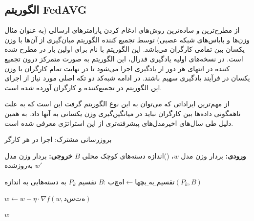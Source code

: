 \subsection{الگوریتم FedAVG }

      از مطرح‌ترین و ساده‌ترین روش‌های ادغام کردن پارامتر‌های ارسالی (به عنوان مثال وزن‌ها و بایاس‌های شبکه عصبی) توسط تجمیع کننده الگوریتم میان‌گیری از آن‌ها با وزن یکسان بین تمامی کارگران می‌باشد. این الگوریتم با نام  برای اولین بار در \cite{b6} مطرح شده است. در نسخه‌های اولیه یادگیری فدرال، این الگوریتم به صورت متمرکز درون تجمیع کننده در انتهای هر دور از یادگیری اجرا می‌شود تا در نهایت تمام کارگران با وزن یکسان در فرآیند یادگیری سهیم باشند. در ادامه شبه‌کد دو تکه اصلی مورد نیاز از اجرای این الگوریتم در تجمیع‌کننده و کارگران آورده شده است.
      
      
      از مهم‌ترین ایراداتی که می‌توان به این نوع الگوریتم گرفت این است که به علت ناهمگونی داده‌ها بین کارگران نباید در میانگین‌گیری وزن یکسانی به آنها داد. به همین دلیل طی سال‌های اخیرمدل‌های پیشرفته‌تری از این استراتژی معرفی شده است\cite{ref4}.
      
      
      \begin{algorithm}[H]
          \caption{بروزرسانی مشترک: اجرا در هر کارگر}
          \label{alg:client_update}
          \begin{algorithmic}[1]
              \State \textbf{ورودی:} بردار وزن مدل $w$، ()اندازه دسته‌های کوچک محلی $B$
              \State \textbf{خروجی:} بردار وزن مدل به‌روزشده $w'$
              
                  \State تقسیم $P_k$ به دسته‌هایی به اندازه $B$: $بچها \gets \text{تقسیم\_به\_بچها}(P_k, B)$
                  
                   
                          \State $w \gets w - \eta \cdot \nabla f(w,دسته)$ 
                      \EndFor
                  \EndFor
                  
                  \State \Return $w$
              \EndFunction
          \end{algorithmic}
      \end{algorithm}
      
